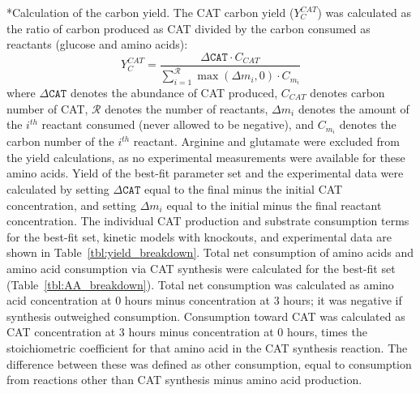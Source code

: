 \documentclass[12pt]{article}
\makeatletter
\renewcommand\subsection{\@startsection
	{subsection}{2}{0mm}
	{-0.05in}
	{-0.5\baselineskip}
	{\normalfont\normalsize\bfseries}}
\makeatother
\begin{document}
\subsection*{Calculation of the carbon yield.}
The CAT carbon yield ($Y_{C}^{CAT}$) was calculated as the ratio of carbon produced as CAT divided by the carbon consumed as reactants (glucose and amino acids):
\begin{equation}\label{eqn:yield-definition}
	Y_{C}^{CAT}=\frac{\Delta\texttt{CAT}\cdot C_{CAT}}{\displaystyle\sum_{i=1}^{\mathcal{R}}\max(\Delta m_{i},0)\cdot C_{m_i}}
\end{equation}
where $\Delta\texttt{CAT}$ denotes the abundance of CAT produced, $C_{CAT}$ denotes carbon number of CAT, $\mathcal{R}$ denotes the number of reactants,
$\Delta m_{i}$ denotes the amount of the $i^{th}$ reactant consumed (never allowed to be negative), and $C_{m_i}$ denotes the carbon number of the $i^{th}$ reactant.
Arginine and glutamate were excluded from the yield calculations, as no experimental measurements were available for these amino acids.
Yield of the best-fit parameter set and the experimental data were calculated by setting $\Delta\texttt{CAT}$ equal to the final minus the initial CAT concentration,
and setting $\Delta m_{i}$ equal to the initial minus the final reactant concentration.
The individual CAT production and substrate consumption terms for the best-fit set, kinetic models with knockouts, and experimental data are shown in Table~\ref{tbl:yield_breakdown}.
Total net consumption of amino acids and amino acid consumption via CAT synthesis were calculated for the best-fit set (Table~\ref{tbl:AA_breakdown}).
Total net consumption was calculated as amino acid concentration at 0 hours minus concentration at 3 hours; it was negative if synthesis outweighed consumption.
Consumption toward CAT was calculated as CAT concentration at 3 hours minus concentration at 0 hours, times the stoichiometric coefficient for that amino acid in the CAT synthesis reaction.
The difference between these was defined as other consumption, equal to consumption from reactions other than CAT synthesis minus amino acid production.
\end{document}
